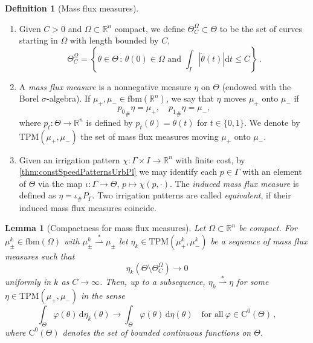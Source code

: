 \documentclass[10pt,a4paper,oneside,final]{article}
\newcommand{\R}{{\mathbb{R}}}
\newcommand{\de}{{\mathrm{d}}}
\newcommand{\fbm}{{\mathrm{fbm}}}
\newcommand{\pushforward}[2]{{{#1}_{\#}#2}}
\newcommand{\weakstarto}{\stackrel{*}{\rightharpoonup}}
\newcommand{\Lip}{\mathrm{Lip}}
\newcommand{\cont}{{\mathrm{C}}}
\newcommand{\contbdd}{\cont^0}
\newcommand{\reSpace}{\Gamma}
\newcommand{\reMeasure}{P_{\reSpace}}
\newcommand{\TPM}{\textrm{TPM}}
\newcommand{\transportPath}{mass flux}
\newcommand{\TransportPath}{Mass flux}
\numberwithin{equation}{section}
\theoremstyle{plain}
\newtheorem{lemma}[theorem]{Lemma}
\theoremstyle{definition}
\newtheorem{definition}[theorem]{Definition}
\theoremstyle{remark}
\newcommand{\notinclude}[1]{}
\begin{document}
\begin{definition}[\TransportPath{} measures]
\begin{enumerate}
\notinclude{We define $\Theta=\Lip(I;\R^n)$ to be the set of Lipschitz curves $I \to \R^n$ with the metric
\begin{equation*}
d_\Theta(\theta_1,\theta_2)=\inf\left\{\max_{t\in I}|\theta_1(t)-\theta_2(\varphi(t))|\ :\ \varphi:I\to I\text{ increasing and bijective}\right\}.
\end{equation*}
}%
\item Given $C>0$ and $\Omega\subset\R^n$ compact, we define $\Theta_C^\Omega\subset\Theta$ to be the set of curves starting in $\Omega$ with length bounded by $C$,
\begin{displaymath}
 \Theta_C^\Omega =\left\{\theta\in\Theta\,:\,\theta(0)\in\Omega\text{ and }\textstyle\int_I |\dot\theta(t)|\de t \leq C\right\}\,.
\end{displaymath}
\item A \emph{\transportPath{} measure} is a nonnegative measure $\eta$ on $\Theta$ (endowed with the Borel $\sigma$-algebra).
If $\mu_+,\mu_- \in \fbm(\R^n)$, we say that $\eta$ moves $\mu_+$ onto $\mu_-$ if
\begin{displaymath}
 \pushforward{p_0}{\eta} = \mu_+,\quad \pushforward{p_1}{\eta} = \mu_-,
\end{displaymath}
where $p_t : \Theta \to \R^n$ is defined by $p_t(\theta) = \theta(t)$ for $t\in\{0,1\}$. We denote by $\TPM(\mu_+,\mu_-)$ the set of \transportPath{} measures moving $\mu_+$ onto $\mu_-$.
\item Given an irrigation pattern $\chi:\reSpace\times I\to\R^n$ with finite cost,
by \cref{thm:constSpeedPatternsUrbPl} we may identify each $p\in\reSpace$ with an element of $\Theta$ via the map $\iota:\reSpace\to\Theta$, $p\mapsto\chi(p,\cdot)$.
The \emph{induced \transportPath{} measure} is defined as $\eta=\pushforward{\iota}{\reMeasure}$.
Two irrigation patterns are called \emph{equivalent}, if their induced \transportPath{} measures coincide.
\end{enumerate}
\end{definition}

\begin{lemma}[Compactness for \transportPath{} measures]\label{lem:compactness_lemma_for_transport_path_measures}
Let $\Omega\subset\R^n$ be compact.
For $\mu_\pm^k\in\fbm(\Omega)$ with $\mu_\pm^k\weakstarto\mu_\pm$
let $\eta_k\in\TPM(\mu_+^k,\mu_-^k)$ be a sequence of \transportPath{} measures such that
\begin{equation*}
\eta_k(\Theta\setminus\Theta_C^\Omega) \to 0
\end{equation*}
uniformly in $k$ as $C\to\infty$.
Then, up to a subsequence, $\eta_k \weakstarto \eta$ for some $\eta\in\TPM(\mu_+,\mu_-)$ in the sense
\begin{displaymath}
 \int_{\Theta} \varphi(\theta)\,\de\eta_k(\theta) \to \int_{\Theta} \varphi(\theta)\,\de\eta(\theta) \quad\text{for all}\ \varphi\in\contbdd(\Theta)\,,
\end{displaymath}
where $\contbdd(\Theta)$ denotes the set of bounded continuous functions on $\Theta$.
\end{lemma}
\end{document}
